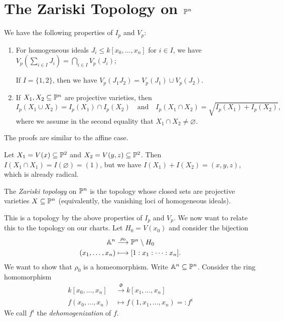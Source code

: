 \section{The Zariski Topology on \texorpdfstring{$\mathbb{P}^n$}{Pn}}

\begin{remark}
  We have the following properties
  of $I_p$ and $V_p$:
  \begin{enumerate}
    \item For homogeneous
      ideals $J_i \le k[x_0, \dots, x_n]$
      for $i \in I$, we have
      $V_p(\sum_{i \in I} J_i) = \bigcap_{i \in I} V_p(J_i)$;

      If $I = \{1, 2\}$, then we have
      $V_p(J_1 J_2) = V_p(J_1) \cup V_p(J_2)$.
    \item If $X_1, X_2 \subseteq \mathbb{P}^n$
      are projective varieties, then
      \[
        I_p(X_1 \cup X_2)
        = I_p(X_1) \cap I_p(X_2)
        \quad \text{and} \quad
        I_p(X_1 \cap X_2)
        = \sqrt{I_p(X_1) + I_p(X_2)},
      \]
      where we assume in the second
      equality that
      $X_1 \cap X_2 \ne \varnothing$.
  \end{enumerate}
  The proofs are similar to the
  affine case.
\end{remark}

\begin{example}
  Let $X_1 = V(x) \subseteq \mathbb{P}^2$
  and $X_2 = V(y, z) \subseteq \mathbb{P}^2$.
  Then $I(X_1 \cap X_1) = I(\varnothing) = (1)$,
  but we have
  $I(X_1) + I(X_2) = (x, y, z)$, which
  is already radical.
\end{example}

\begin{definition}
  The \emph{Zariski topology} on
  $\mathbb{P}^n$ is the topology whose
  closed sets are projective
  varieties $X \subseteq \mathbb{P}^n$
  (equivalently, the vanishing loci
  of homogeneous ideals).
\end{definition}

\begin{remark}
  This is a topology by the above
  properties of $I_p$ and $V_p$.
  We now want to relate this to
  the topology on our charts.
  Let $H_0 = V(x_0)$ and consider
  the bijection
  \begin{align*}
    \mathbb{A}^n
    &\overset{\rho_0}{\longrightarrow} \mathbb{P}^n \setminus H_0 \\
    (x_1, \dots, x_n)
    &\longmapsto [1 : x_1 : \dots : x_n].
  \end{align*}
  We want to show that $\rho_0$ is a
  homeomorphism. Write
  $\mathbb{A}^n \subseteq \mathbb{P}^n$.
  Consider the ring homomorphism
  \begin{align*}
    k[x_0, \dots, x_n]
    &\overset{\Phi}{\longrightarrow} k[x_1, \dots, x_n] \\
    f(x_0, \dots, x_n)
    &\longmapsto f(1, x_1, \dots, x_n) =: f^i
  \end{align*}
  We call $f^i$ the
  \emph{dehomogenization} of $f$.
\end{remark}

